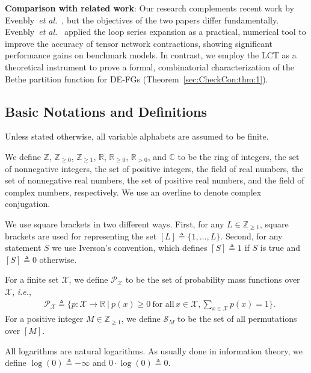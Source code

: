 \documentclass[journal]{IEEEtran}
\newcommand{\add}[1]{{\color{black}#1}}
\newcommand{\set}[1]{\mathcal{#1}}
\newcommand{\imagunit}{\iota}
\newcommand{\sR}{\mathbb{R}}
\newcommand{\sC}{\mathbb{C}}
\newcommand{\sZ}{\mathbb{Z}}
\newcommand{\defeq}{ \triangleq }
\newcommand{\sRp}{ \mathbb{R}_{\geq 0} }
\newcommand{\sRpp}{ \mathbb{R}_{> 0} }
\newcommand{\sZp}{ \mathbb{Z}_{\geq 0} }
\newcommand{\sZpp}{ \mathbb{Z}_{\geq 1} }
\newcommand*{\ie}{\textit{i.e.}}
\newcommand*{\etal}{\textit{et al.}}
\newcommand{\pmf}[1]{ \set{P}_{#1} }
\begin{document}
\textbf{Comparison with related work}: Our research complements recent work by
Evenbly~\etal~\cite{Evenbly2024}, but the objectives of the two papers differ
fundamentally. Evenbly~\etal~\cite{Evenbly2024} applied the loop series
expansion as a practical, numerical tool to improve the accuracy of tensor
network contractions, showing significant performance gains on benchmark
models. In contrast, we employ the LCT as a theoretical instrument to prove a
formal, combinatorial characterization of the Bethe partition function for
DE-FGs (Theorem~\ref{sec:CheckCon:thm:1}).

\subsection{Basic Notations and Definitions}

Unless stated otherwise, all variable alphabets are assumed to be finite.

We define $\sZ$, $\sZp$, $\sZpp$, $\sR$, $\sRp$, $\sRpp$, and $\sC$ to be the
ring of integers, the set of \add{nonnegative} integers, the set of positive
integers, the field of real numbers, the set of \add{nonnegative} real
numbers, the set of positive real numbers, and the field of \add{complex
  numbers}, respectively. We use an overline to denote complex conjugation.


We use square brackets in two different ways. First, for any $L \in \sZpp$,
square brackets are used for representing the set
$[L] \defeq \{1, \ldots, L\}$. Second, for any statement $S$ we use Iverson's
convention, which defines $[S] \defeq 1$ if $S$ is true and $[S] \defeq 0$
otherwise.

For a finite set $\set{X}$, we define $\pmf{\set{X}}$ to be the set of probability
mass functions over $\set{X}$, \ie,
\begin{align*}
   & \pmf{\set{X}} \defeq \Biggl\{ p: \set{X} \to \sR \ \Biggl| \ p(x) \geq 0 \
  \text{for all} \,
  x \in \set{X}, \sum_{x \in \set{X}} p(x) = 1 \Biggr\}.
\end{align*}
For a positive integer $M \in \sZpp$, we define $\set{S}_M$ to be the set of all
permutations over $[M]$.

All logarithms are natural logarithms. As usually done in information theory,
we define $\log(0) \defeq -\infty$ and $0 \cdot \log(0) \defeq 0$.
\end{document}
